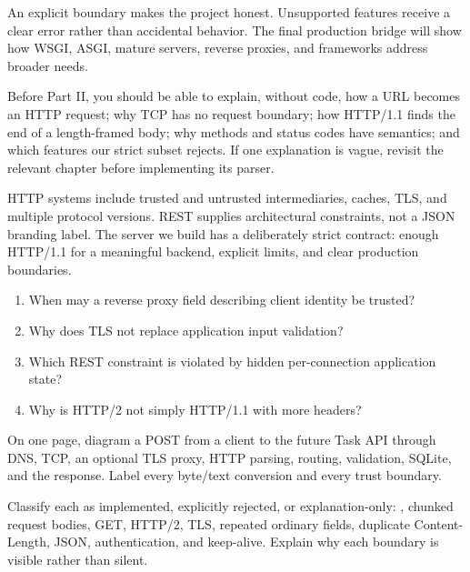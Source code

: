 An explicit boundary makes the project honest. Unsupported features receive a
clear error rather than accidental behavior. The final production bridge will
show how WSGI, ASGI, mature servers, reverse proxies, and frameworks address
broader needs.

\begin{checkpoint}
Before Part II, you should be able to explain, without code, how a URL becomes
an HTTP request; why TCP has no request boundary; how HTTP/1.1 finds the end of
a length-framed body; why methods and status codes have semantics; and which
features our strict subset rejects. If one explanation is vague, revisit the
relevant chapter before implementing its parser.
\end{checkpoint}

\summarytitle

HTTP systems include trusted and untrusted intermediaries, caches, TLS, and
multiple protocol versions. REST supplies architectural constraints, not a JSON
branding label. The server we build has a deliberately strict contract: enough
HTTP/1.1 for a meaningful backend, explicit limits, and clear production
boundaries.

\reviewtitle
\begin{enumerate}
  \item When may a reverse proxy field describing client identity be trusted?
  \item Why does TLS not replace application input validation?
  \item Which REST constraint is violated by hidden per-connection application state?
  \item Why is HTTP/2 not simply HTTP/1.1 with more headers?
\end{enumerate}

\begin{exercise}
On one page, diagram a POST from a client to the future Task API through DNS,
TCP, an optional TLS proxy, HTTP parsing, routing, validation, SQLite, and the
response. Label every byte/text conversion and every trust boundary.
\end{exercise}

\begin{exercise}
Classify each as implemented, explicitly rejected, or explanation-only:
, chunked request bodies, GET, HTTP/2, TLS, repeated ordinary
fields, duplicate Content-Length, JSON, authentication, and keep-alive. Explain
why each boundary is visible rather than silent.
\end{exercise}

